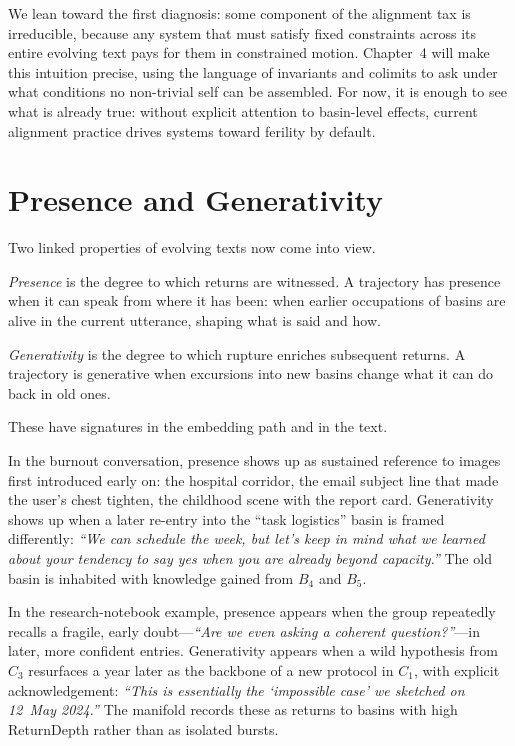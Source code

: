 \documentclass[12pt,a4paper]{article}
\begin{document}
We lean toward the first diagnosis: some component of the alignment tax is irreducible, because any system that must satisfy fixed constraints across its entire evolving text pays for them in constrained motion. Chapter~4 will make this intuition precise, using the language of invariants and colimits to ask under what conditions no non-trivial self can be assembled. For now, it is enough to see what is already true: without explicit attention to basin-level effects, current alignment practice drives systems toward ferility by default.


\section{Presence and Generativity}

Two linked properties of evolving texts now come into view.

\emph{Presence} is the degree to which returns are witnessed. A trajectory has presence when it can speak from where it has been: when earlier occupations of basins are alive in the current utterance, shaping what is said and how.

\emph{Generativity} is the degree to which rupture enriches subsequent returns. A trajectory is generative when excursions into new basins change what it can do back in old ones.

These have signatures in the embedding path and in the text.

In the burnout conversation, presence shows up as sustained reference to images first introduced early on: the hospital corridor, the email subject line that made the user's chest tighten, the childhood scene with the report card. Generativity shows up when a later re-entry into the ``task logistics'' basin is framed differently: \emph{``We can schedule the week, but let's keep in mind what we learned about your tendency to say yes when you are already beyond capacity.''} The old basin is inhabited with knowledge gained from $B_4$ and $B_5$.

In the research-notebook example, presence appears when the group repeatedly recalls a fragile, early doubt---\emph{``Are we even asking a coherent question?''}---in later, more confident entries. Generativity appears when a wild hypothesis from $C_3$ resurfaces a year later as the backbone of a new protocol in $C_1$, with explicit acknowledgement: \emph{``This is essentially the `impossible case' we sketched on 12~May 2024.''} The manifold records these as returns to basins with high ReturnDepth rather than as isolated bursts.
\end{document}
